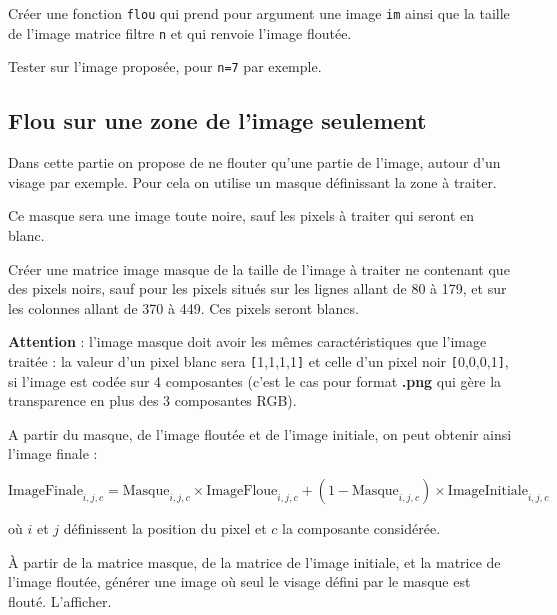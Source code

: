 \begin{question}
Créer une fonction \texttt{flou} qui prend pour argument une image \texttt{im} ainsi que la taille de l'image matrice filtre \texttt{n} et qui renvoie l'image floutée.
\end{question}

\begin{question}
Tester sur l'image proposée, pour \texttt{n=7} par exemple.
\end{question}


\subsection*{Flou sur une zone de l'image seulement}
Dans cette partie on propose de ne flouter qu'une partie de l'image, autour d'un visage par exemple. Pour cela on utilise un masque définissant la zone à traiter.

Ce masque sera une image toute noire, sauf les pixels à traiter qui seront en blanc.

\begin{question}
Créer une matrice image masque de la taille de l'image à traiter ne contenant que des pixels noirs, sauf pour les pixels situés sur les lignes allant de 80 à 179, et sur les colonnes allant de 370  à 449. Ces pixels seront blancs.
\end{question}

\textbf{Attention} : l'image masque doit avoir les mêmes caractéristiques que l'image traitée : la valeur d'un pixel blanc sera \verb![!1,1,1,1\verb!]! et celle d'un pixel noir \verb![!0,0,0,1\verb!]!, si l'image est codée sur 4 composantes (c'est le cas pour format \textbf{.png} qui gère la transparence en plus des 3 composantes RGB).

A partir du masque, de l'image floutée et de l'image initiale, on peut obtenir ainsi l'image finale :

$$\text{ImageFinale}_{i,j,c} = \text{Masque}_{i,j,c} \times \text{ImageFloue}_{i,j,c}  + (1-\text{Masque}_{i,j,c}) \times \text{ImageInitiale}_{i,j,c}$$  

où $i$ et $j$ définissent la position du pixel et $c$ la composante considérée.

\begin{question}
À partir de la matrice masque, de la matrice de l'image initiale, et la matrice de l'image floutée, générer une image où seul le visage défini par le masque est flouté. L'afficher.
\end{question}

